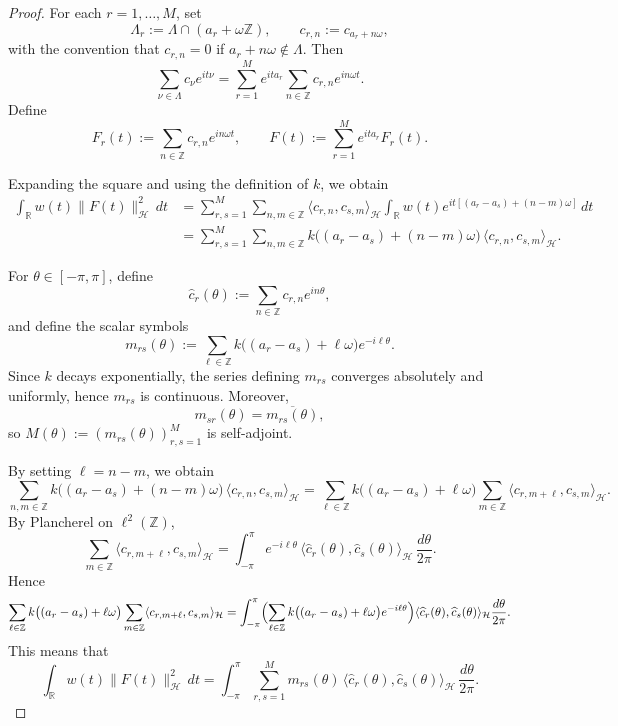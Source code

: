 \documentclass[11pt]{amsart}
\newcommand{\1}{\mathbbm{1}}
\theoremstyle{plain}
\theoremstyle{definition}
\theoremstyle{remark}
\numberwithin{equation}{section}
\begin{document}
\begin{proof}
For each $r=1,\dots,M$, set
\[
\Lambda_r := \Lambda \cap (a_r+\omega\mathbb Z),
\qquad
c_{r,n} := c_{a_r+n\omega},
\]
with the convention that $c_{r,n}=0$ if $a_r+n\omega\notin\Lambda$.
Then
\[
\sum_{\nu\in\Lambda} c_\nu e^{it\nu}
=
\sum_{r=1}^M e^{ita_r}\sum_{n\in\mathbb Z} c_{r,n} e^{in\omega t}.
\]
Define
\[
F_r(t):=\sum_{n\in\mathbb Z} c_{r,n} e^{in\omega t},
\qquad
F(t):=\sum_{r=1}^M e^{ita_r}F_r(t).
\]

Expanding the square and using the definition of $k$, we obtain
\begin{align*}
\int_{\mathbb R} w(t)\|F(t)\|_{\mathcal H}^2\,dt
&=
\sum_{r,s=1}^M \sum_{n,m\in\mathbb Z}
\langle c_{r,n},c_{s,m}\rangle_{\mathcal H}
\int_{\mathbb R} w(t)e^{it[(a_r-a_s)+(n-m)\omega]}\,dt \\
&=
\sum_{r,s=1}^M \sum_{n,m\in\mathbb Z}
k\big((a_r-a_s)+(n-m)\omega\big)\,
\langle c_{r,n},c_{s,m}\rangle_{\mathcal H}.
\end{align*}

For $\theta\in[-\pi,\pi]$, define
\[
\widehat c_r(\theta):=\sum_{n\in\mathbb Z} c_{r,n}e^{in\theta},
\]
and define the scalar symbols
\[
m_{rs}(\theta)
:=
\sum_{\ell\in\mathbb Z}
k\big((a_r-a_s)+\ell\omega\big)e^{-i\ell\theta}.
\]
Since $k$ decays exponentially, the series defining $m_{rs}$ converges absolutely and uniformly, hence $m_{rs}$ is continuous. Moreover,
\[
m_{sr}(\theta)=\overline{m_{rs}(\theta)},
\]
so $M(\theta):=(m_{rs}(\theta))_{r,s=1}^M$ is self-adjoint.

By setting $\ell=n-m$, we obtain
\[
\sum_{n,m\in\mathbb Z}
k\bigl((a_r-a_s)+(n-m)\omega\bigr)\,
\langle c_{r,n},c_{s,m}\rangle_{\mathcal H}
= \sum_{\ell\in\mathbb Z}
k\bigl((a_r-a_s)+\ell\omega\bigr)
\sum_{m\in\mathbb Z}
\langle c_{r,m+\ell},c_{s,m}\rangle_{\mathcal H}.
\]
By Plancherel on $\ell^2(\mathbb Z)$,
\[
\sum_{m\in\mathbb Z}
\langle c_{r,m+\ell},c_{s,m}\rangle_{\mathcal H}
=
\int_{-\pi}^{\pi}
e^{-i\ell\theta}\,
\langle \widehat c_r(\theta),\widehat c_s(\theta)\rangle_{\mathcal H}
\,\frac{d\theta}{2\pi}.
\]
Hence
\[
\sum_{\ell\in\mathbb Z}
k\bigl((a_r-a_s)+\ell\omega\bigr)
\sum_{m\in\mathbb Z}
\langle c_{r,m+\ell},c_{s,m}\rangle_{\mathcal H}= \int_{-\pi}^{\pi}
\Bigl(
\sum_{\ell\in\mathbb Z}
k\bigl((a_r-a_s)+\ell\omega\bigr)e^{-i\ell\theta}
\Bigr)
\langle \widehat c_r(\theta),\widehat c_s(\theta)\rangle_{\mathcal H}
\frac{d\theta}{2\pi}.
\]
This means that
\[
\int_{\mathbb R} w(t)\|F(t)\|_{\mathcal H}^2\,dt
=
\int_{-\pi}^{\pi}
\sum_{r,s=1}^M
m_{rs}(\theta)\,
\langle \widehat c_r(\theta),\widehat c_s(\theta)\rangle_{\mathcal H}
\,\frac{d\theta}{2\pi}.
\]


\end{proof}
\end{document}
